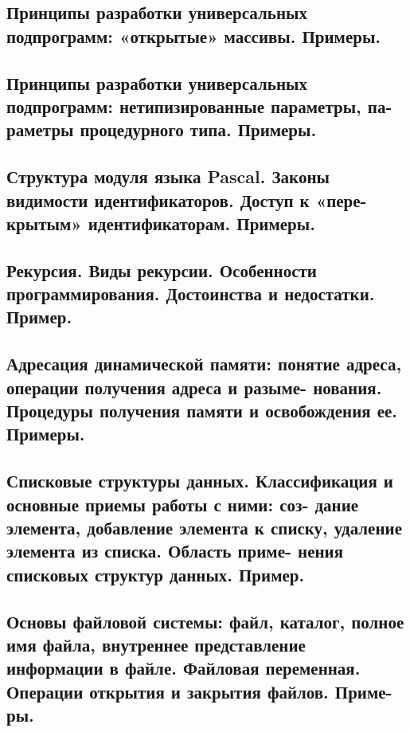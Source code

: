 \documentclass[a4paper, 10pt]{article}
\begin{document}
\subsection{Принципы разработки универсальных подпрограмм: «открытые» массивы. Примеры. }



\subsection{Принципы разработки универсальных подпрограмм:  нетипизированные параметры, па-
раметры процедурного типа. Примеры. }



\subsection{Структура модуля языка Pascal. Законы видимости идентификаторов. Доступ к «пере-
крытым» идентификаторам. Примеры. }



\subsection{Рекурсия.  Виды  рекурсии.  Особенности  программирования. Достоинства  и  недостатки. 
Пример. }



\subsection{Адресация динамической памяти: понятие адреса, операции получения адреса и разыме-
нования. Процедуры получения памяти и освобождения ее. Примеры. }



\subsection{Списковые  структуры  данных.  Классификация  и  основные  приемы  работы  с  ними:  соз-
дание элемента, добавление элемента к списку, удаление элемента из списка. Область приме-
нения списковых структур данных. Пример. }



\subsection{Основы файловой системы: файл, каталог, полное имя файла, внутреннее представление 
информации в файле. Файловая переменная. Операции открытия и закрытия файлов. Приме-
ры. }
\end{document}
